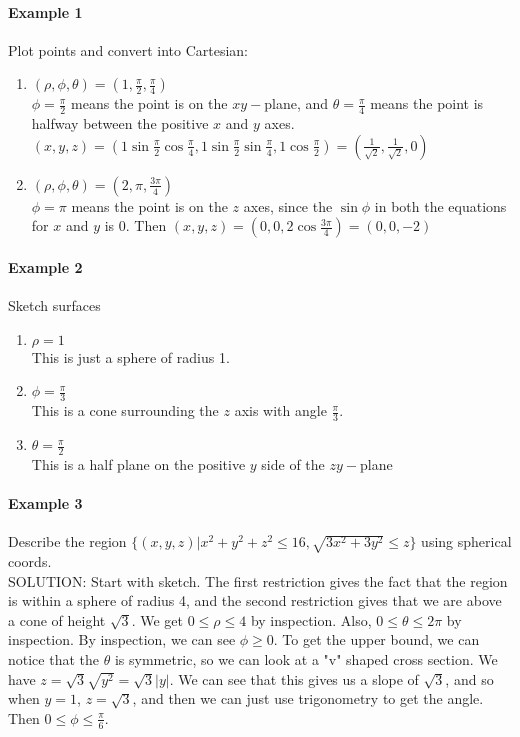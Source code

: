 \documentclass[tikz,10pt,letter]{article}
\theoremstyle{plain}
\theoremstyle{definition}
\begin{document}
\paragraph{Example 1}
Plot points and convert into Cartesian: 
\begin{enumerate}
    \item $(\rho,\phi,\theta)=(1,\frac{\pi}{2},\frac{\pi}{4})$\\ 
    $\phi=\frac{\pi}{2}$ means the point is on the $xy-$plane, and $\theta=\frac{\pi}{4}$ means the point is halfway between the positive $x$ and $y$ axes. $(x,y,z)=\left(1\sin\frac{\pi}{2}\cos\frac{\pi}{4},1\sin\frac{\pi}{2}\sin\frac{\pi}{4},1\cos\frac{\pi}{2}\right)=\left(\frac{1}{\sqrt{2}},\frac{1}{\sqrt{2}},0\right)$
    \item $(\rho,\phi,\theta)=(2,\pi,\frac{3\pi}{4})$\\ 
    $\phi=\pi$ means the point is on the $z$ axes, since the $\sin\phi$ in both the equations for $x$ and $y$ is 0. Then $(x,y,z)=\left(0,0,2\cos\frac{3\pi}{4}\right)=(0,0,-2)$
\end{enumerate}
\paragraph{Example 2}
Sketch surfaces 
\begin{enumerate}
    \item $\rho=1$\\ 
    This is just a sphere of radius 1. 
    \item $\phi=\frac{\pi}{3}$ \\
    This is a cone surrounding the $z$ axis with angle $\frac{\pi}{3}$. 
    \item $\theta=\frac{\pi}{2}$\\
    This is a half plane on the positive $y$ side of the $zy-$plane
\end{enumerate}
\paragraph{Example 3}
Describe the region $\lbrace(x,y,z)|x^2+y^2+z^2\leq16,\sqrt{3x^2+3y^2}\leq z\rbrace$ using spherical coords. \\ 
SOLUTION: Start with sketch. The first restriction gives the fact that the region is within a sphere of radius 4, and the second restriction gives that we are above a cone of height $\sqrt{3}$. We get $0\leq\rho\leq4$ by inspection. Also, $0\leq\theta\leq2\pi$ by inspection. By inspection, we can see $\phi\geq0$. To get the upper bound, we can notice that the $\theta$ is symmetric, so we can look at a "v" shaped cross section. We have $z=\sqrt{3}\sqrt{y^2}=\sqrt{3}|y|$. We can see that this gives us a slope of $\sqrt{3}$, and so when $y=1$, $z=\sqrt{3}$, and then we can just use trigonometry to get the angle. Then $0\leq\phi\leq\frac{\pi}{6}$. 
\end{document}
